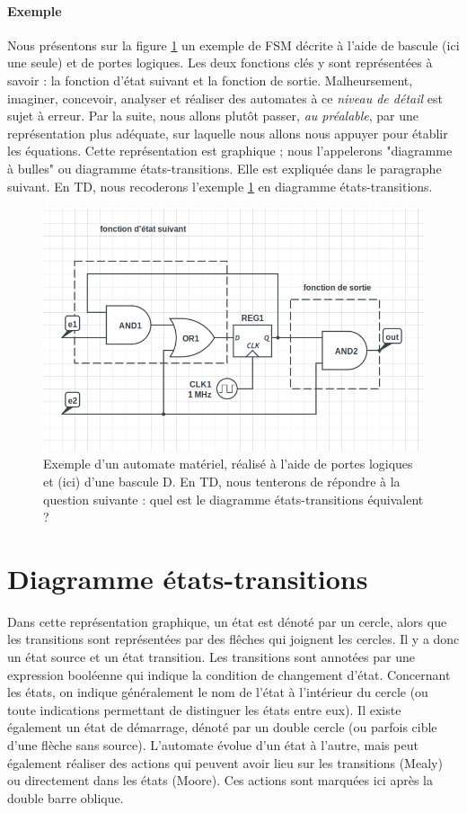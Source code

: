 \paragraph{Exemple}
Nous présentons sur la figure \ref{fig:fsm} un exemple de FSM décrite à l'aide de bascule (ici une seule) et de portes logiques.
Les deux fonctions clés y sont représentées à savoir : la fonction d'état suivant et la fonction de sortie.
Malheursement, imaginer, concevoir, analyser et réaliser des automates à ce {\it niveau de détail} est sujet à erreur.
Par la suite, nous allons plutôt passer, {\it au préalable}, par une représentation plus adéquate, sur laquelle nous allons nous appuyer pour
établir les équations. Cette représentation est graphique ; nous l'appelerons "diagramme à bulles" ou diagramme états-transitions.
Elle est expliquée dans le paragraphe suivant. En TD, nous recoderons l'exemple \ref{fig:fsm} en diagramme états-transitions.
\begin{figure}[h]
  \centering
  \includegraphics[scale=0.4]{./figures/fsm-ex1.png}
  \caption{Exemple d'un automate matériel, réalisé à l'aide de portes logiques et (ici) d'une bascule D. En TD, nous tenterons de répondre à la question suivante : quel est le diagramme états-transitions équivalent ?}
  \label{fig:fsm}
\end{figure}

\section{Diagramme états-transitions}
Dans cette représentation graphique, un état est dénoté par un cercle, alors que les transitions sont représentées par
des flêches qui joignent les cercles. Il y a donc un état source et un état transition. Les transitions sont annotées par une expression booléenne qui indique la condition de changement d'état. Concernant les états, on indique
généralement le nom de l'état à l'intérieur du cercle (ou toute indications permettant de distinguer les états entre eux). Il existe également un état de démarrage, dénoté par un double cercle (ou parfois cible d'une flèche sans source).
L'automate évolue d'un état à l'autre, mais peut également réaliser des actions qui peuvent avoir lieu sur les transitions (Mealy) ou directement dans les états (Moore). Ces actions sont marquées ici après la double barre oblique.

